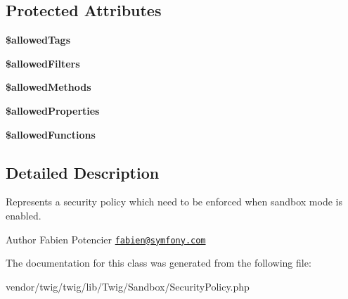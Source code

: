 \subsection*{Protected Attributes}
\begin{DoxyCompactItemize}
\item 
{\bfseries \$allowed\+Tags}\hypertarget{classTwig__Sandbox__SecurityPolicy_aee8a85b72a7dfc8388072f3bce6e257f}{}\label{classTwig__Sandbox__SecurityPolicy_aee8a85b72a7dfc8388072f3bce6e257f}

\item 
{\bfseries \$allowed\+Filters}\hypertarget{classTwig__Sandbox__SecurityPolicy_a99598cc1ae5dd3e32e77c59444955012}{}\label{classTwig__Sandbox__SecurityPolicy_a99598cc1ae5dd3e32e77c59444955012}

\item 
{\bfseries \$allowed\+Methods}\hypertarget{classTwig__Sandbox__SecurityPolicy_a2729db178e48f56d8ffdee7fae25ca14}{}\label{classTwig__Sandbox__SecurityPolicy_a2729db178e48f56d8ffdee7fae25ca14}

\item 
{\bfseries \$allowed\+Properties}\hypertarget{classTwig__Sandbox__SecurityPolicy_a0b0a88bceff164969e3731086d5e2b3b}{}\label{classTwig__Sandbox__SecurityPolicy_a0b0a88bceff164969e3731086d5e2b3b}

\item 
{\bfseries \$allowed\+Functions}\hypertarget{classTwig__Sandbox__SecurityPolicy_a1eb7d29e31599da3e6fde501ca46db35}{}\label{classTwig__Sandbox__SecurityPolicy_a1eb7d29e31599da3e6fde501ca46db35}

\end{DoxyCompactItemize}


\subsection{Detailed Description}
Represents a security policy which need to be enforced when sandbox mode is enabled.

\begin{DoxyAuthor}{Author}
Fabien Potencier \href{mailto:fabien@symfony.com}{\tt fabien@symfony.\+com} 
\end{DoxyAuthor}


The documentation for this class was generated from the following file\+:\begin{DoxyCompactItemize}
\item 
vendor/twig/twig/lib/\+Twig/\+Sandbox/Security\+Policy.\+php\end{DoxyCompactItemize}
